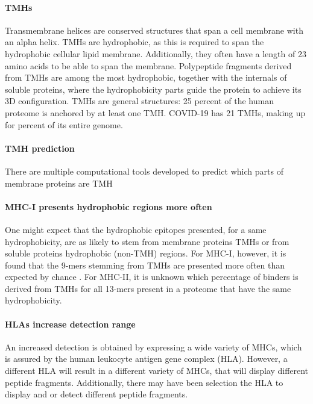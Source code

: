  
\paragraph{TMHs}

Transmembrane helices are conserved structures that span
a cell membrane with an alpha helix.
TMHs are hydrophobic, as this is required to span the 
hydrophobic cellular lipid membrane. Additionally,
they often have a length of 23 amino acids to be able to span
the membrane.
Polypeptide fragments derived from TMHs are among the most hydrophobic,
together with the internals of soluble proteins, where the
hydrophobicity parts guide the protein to achieve its 3D configuration.
TMHs are general structures: 25 percent of the human proteome is
anchored by at least one TMH. COVID-19 has 21 TMHs, 
making up for  percent of its entire genome.

\paragraph{TMH prediction}

There are multiple computational tools developed to predict which
parts of membrane proteins are TMH

\paragraph{MHC-I presents hydrophobic regions more often}

One might expect that the hydrophobic epitopes presented,
for a same hydrophobicity, are as likely to stem from 
membrane proteins TMHs or from soluble proteins hydrophobic (non-TMH) regions.
For MHC-I, however, it is found that the 9-mers stemming
from TMHs are presented more often than expected by 
chance \cite{bianchi2017}
.
For MHC-II, it is unknown which percentage of binders 
is derived from TMHs for all 13-mers present in a proteome
that have the same hydrophobicity.

\paragraph{HLAs increase detection range}

An increased detection
is obtained by expressing a wide variety of
MHCs, which is assured by the human leukocyte antigen gene complex (HLA).
However, a different HLA will result in a different variety of MHCs,
that will display different peptide fragments. Additionally, there
may have been selection the HLA to display and or detect different
peptide fragments.

